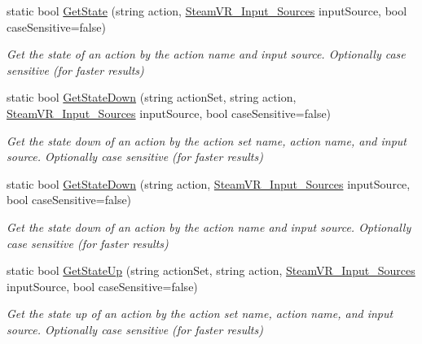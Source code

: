 \begin{DoxyCompactItemize}
static bool \mbox{\hyperlink{class_valve_1_1_v_r_1_1_steam_v_r___input_ab69880cc4e27624b6457412ac174887b}{Get\+State}} (string action, \mbox{\hyperlink{namespace_valve_1_1_v_r_a82e5bf501cc3aa155444ee3f0662853f}{Steam\+V\+R\+\_\+\+Input\+\_\+\+Sources}} input\+Source, bool case\+Sensitive=false)
\begin{DoxyCompactList}\small\item\em Get the state of an action by the action name and input source. Optionally case sensitive (for faster results) \end{DoxyCompactList}\item 
static bool \mbox{\hyperlink{class_valve_1_1_v_r_1_1_steam_v_r___input_a7e07d6cb414b57fb9adafdb25a18a7cf}{Get\+State\+Down}} (string action\+Set, string action, \mbox{\hyperlink{namespace_valve_1_1_v_r_a82e5bf501cc3aa155444ee3f0662853f}{Steam\+V\+R\+\_\+\+Input\+\_\+\+Sources}} input\+Source, bool case\+Sensitive=false)
\begin{DoxyCompactList}\small\item\em Get the state down of an action by the action set name, action name, and input source. Optionally case sensitive (for faster results) \end{DoxyCompactList}\item 
static bool \mbox{\hyperlink{class_valve_1_1_v_r_1_1_steam_v_r___input_a8f579cd67ec947e3049a5e8551d54b67}{Get\+State\+Down}} (string action, \mbox{\hyperlink{namespace_valve_1_1_v_r_a82e5bf501cc3aa155444ee3f0662853f}{Steam\+V\+R\+\_\+\+Input\+\_\+\+Sources}} input\+Source, bool case\+Sensitive=false)
\begin{DoxyCompactList}\small\item\em Get the state down of an action by the action name and input source. Optionally case sensitive (for faster results) \end{DoxyCompactList}\item 
static bool \mbox{\hyperlink{class_valve_1_1_v_r_1_1_steam_v_r___input_a3cab34370f541034f4ad7cb2f3850019}{Get\+State\+Up}} (string action\+Set, string action, \mbox{\hyperlink{namespace_valve_1_1_v_r_a82e5bf501cc3aa155444ee3f0662853f}{Steam\+V\+R\+\_\+\+Input\+\_\+\+Sources}} input\+Source, bool case\+Sensitive=false)
\begin{DoxyCompactList}\small\item\em Get the state up of an action by the action set name, action name, and input source. Optionally case sensitive (for faster results) \end{DoxyCompactList}\item 

\end{DoxyCompactItemize}
